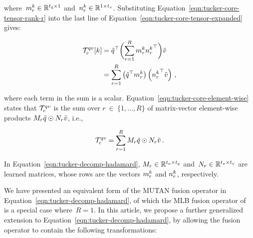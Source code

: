 \noindent where~$m_r^k \in \mathbb{R}^{t_q \times 1}$ and~$n_r^k \in \mathbb{R}^{1 \times t_v}$.
Substituting Equation~\ref{eqn:tucker-core-tensor-rank-r} into the last line of
Equation~\ref{eqn:tucker-core-tensor-expanded} gives:

\begin{align}
\begin{split}
        \mathcal{T}_c^{qv}[k] &= {\tilde{q}}^\top
                \biggl(\sum_{r = 1}^R m_r^k {n_r^k}^\top\biggr) \tilde{v}  \\
                     &= \sum_{r = 1}^R \left({\tilde{q}}^\top m_r^k\right)
                                \left({n_r^k}^\top \tilde{v}\right) \,,
\end{split}
\label{eqn:tucker-core-element-wise}
\end{align}

\noindent where each term in the sum is a scalar.
Equation~\ref{eqn:tucker-core-element-wise} states that $\mathcal{T}_c^{q{}v{}}$ is the sum
over $r~\in~\{1, \dots, R\}$ of matrix-vector element-wise products
$M_r \tilde{q} \odot N_r \tilde{v}$, i.e.,

\begin{equation}
        \mathcal{T}_c^{q{}v{}} =
                \sum_{r = 1}^R M_r \tilde{q} \odot N_r \tilde{v} \,.
\label{eqn:tucker-decomp-hadamard}
\end{equation}

\noindent In Equation~\ref{eqn:tucker-decomp-hadamard}, $M_r \in \mathbb{R}^{t_o \times t_q}$
and~$N_r \in \mathbb{R}^{t_o \times t_v}$ are learned matrices, whose rows are the
vectors $m_r^k$ and $n_r^k$, respectively.

We have presented an equivalent form of the MUTAN fusion operator in
Equation~\ref{eqn:tucker-decomp-hadamard}, of which the MLB fusion operator
of~\citet{Kim2017} is a special case where~$R = 1$. In this article, we propose a
further generalized extension to Equation~\ref{eqn:tucker-decomp-hadamard}, by
allowing the fusion operator to contain the following transformations:

